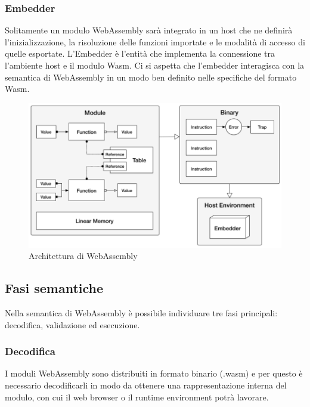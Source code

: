 \subsubsection{Embedder}
Solitamente un modulo WebAssembly sarà integrato in un host che ne definirà l'inizializzazione, la risoluzione delle funzioni importate  e le modalità di accesso di quelle esportate. L'Embedder è l'entità che implementa la connessione tra l'ambiente host e il modulo Wasm. Ci si aspetta che l'embedder interagisca con la semantica di WebAssembly in un modo ben definito nelle specifiche del formato Wasm.
\begin{figure}
        \begin{center}
                \includegraphics[width=0.9\columnwidth]{images/wasmArchitecture.png}
        \end{center}
        \caption{Architettura di WebAssembly}
        \label{fig:wasmArch}
\end{figure}
\newpage
\subsection{Fasi semantiche}
Nella semantica di WebAssembly è possibile individuare tre fasi principali: decodifica, validazione ed esecuzione.\cite*{wasmSpec}
\subsubsection{Decodifica}
I moduli WebAssembly sono distribuiti in formato binario (.wasm) e per questo è necessario decodificarli in modo da ottenere una rappresentazione interna del modulo, con cui il web browser o il runtime environment potrà lavorare.
